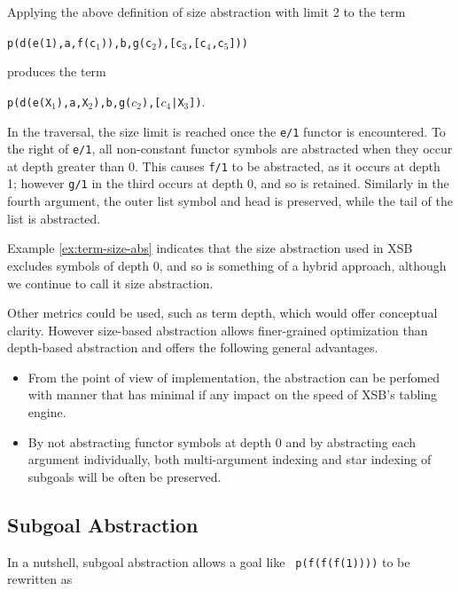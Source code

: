 
\begin{example} \label{ex:term-size-abs}
Applying the above definition of size abstraction with limit 2 to the
term 

{\tt p(d(e(1),a,f(c$_1$)),b,g(c$_2$),[c$_3$,[c$_4$,c$_5$]))}

\noindent
  produces the term 

{\tt p(d(e(X$_1$),a,X$_2$),b,g($c_2$),[$c_4$|X$_3$])}.  

\noindent
In the traversal, the size limit is reached once the {\tt e/1} functor
is encountered.  To the right of {\tt e/1}, all non-constant functor
symbols are abstracted when they occur at depth greater than 0.  This
causes {\tt f/1} to be abstracted, as it occurs at depth 1; however
{\tt g/1} in the third occurs at depth 0, and so is retained.
Similarly in the fourth argument, the outer list symbol and head is
preserved, while the tail of the list is abstracted.
\end{example}

Example \ref{ex:term-size-abs} indicates that the size abstraction
used in XSB excludes symbols of depth 0, and so is something of a
hybrid approach, although we continue to call it size abstraction.

Other metrics could be used, such as term depth, which would offer
conceptual clarity.  However size-based abstraction allows
finer-grained optimization than depth-based abstraction and offers the
following general advantages.
\begin{itemize}
\item From the point of view of implementation, the abstraction can be
  perfomed with manner that has minimal if any impact on the speed of
  XSB's tabling engine. 
\item By not abstracting functor symbols at depth 0 and by abstracting
  each argument individually, both multi-argument indexing and star
  indexing of subgoals will be often be preserved.
\end{itemize}

\subsection{Subgoal Abstraction} \label{sec:subg-abs}
%
In a nutshell, subgoal abstraction allows a goal like {\tt
  p(f(f(f(1))))} to be rewritten as 

